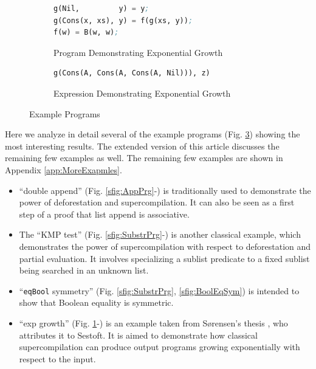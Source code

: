 \documentclass[submission,copyright,creativecommons]{eptcs}
\begin{document}
\begin{figure}
\begin{subfigure}[b]{\linewidth}
\begin{lstlisting}[language=Lisp,keywords={}]
g(Nil,         y) = y;
g(Cons(x, xs), y) = f(g(xs, y));
f(w) = B(w, w);
\end{lstlisting}
\caption{Program Demonstrating Exponential Growth}
\label{sfig:ExpGrowthPrg}
\end{subfigure}

\begin{subfigure}[b]{\linewidth}
\begin{lstlisting}[language=Lisp,keywords={}]
g(Cons(A, Cons(A, Cons(A, Nil))), z)
\end{lstlisting}
\caption{Expression Demonstrating Exponential Growth}
\label{sfig:ExpGrowth}
\end{subfigure}

\caption{Example Programs}\label{fig:Examples}
\end{figure}

Here we analyze in detail several of the example programs (Fig. \ref{fig:Examples}) showing the most interesting results.
\ifVptVer
The extended version of this article \cite{krustev2020MrscOptSizeReport} discusses the remaining few examples as well.
\else
The remaining few examples are shown in Appendix \ref{app:MoreExapmles}.
\fi
\begin{itemize}
  \item ``double append'' (Fig. \ref{sfig:AppPrg}-) is traditionally used to 
    demonstrate the power of deforestation and supercompilation.
    It can also be seen as a first step of a proof that list append is associative.
  \item The ``KMP test'' (Fig. \ref{sfig:SubstrPrg}-) is another classical example, 
    which demonstrates the power of supercompilation with respect to deforestation and partial evaluation.
    It involves specializing a sublist predicate to a fixed sublist being
    searched in an unknown list.
  \item ``\verb|eqBool| symmetry'' (Fig. \ref{sfig:SubstrPrg}, \ref{sfig:BoolEqSym}) is intended
    to show that Boolean equality is symmetric.
  \item ``exp growth'' (Fig. \ref{sfig:ExpGrowthPrg}-) is an example taken 
    from S{\o}rensen's thesis \cite[Example 11.4.1]{Sorensen1994TurchinSupercompiler}, who attributes it to Sestoft.
    It is aimed to demonstrate how classical supercompilation can produce output programs
    growing exponentially with respect to the input.
\end{itemize}
\end{document}
